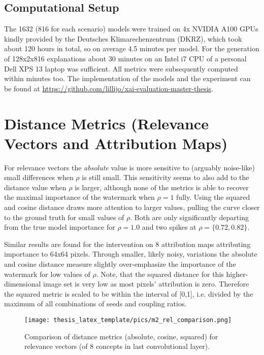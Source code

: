 \subsection{Computational Setup}\label{appendix:setup}
The 1632 (816 for each scenario) models were trained on 4x NVIDIA A100 GPUs kindly provided by the Deutsches Klimarechenzentrum (DKRZ), which took about 120 hours in total, so on average 4.5 minutes per model. 
For the generation of 128x2x816 explanations about 30 minutes on an Intel i7 CPU of a personal Dell XPS 13 laptop was sufficient. All metrics were subsequently computed within minutes too. 
The implementation of the models and the experiment can be found at \url{https://github.com/lillijo/xai-evaluation-master-thesis}.

\section{Distance Metrics (Relevance Vectors and Attribution Maps)}\label{appendix:distance_metrics}

For relevance vectors the \textit{absolute} value is more sensitive to (arguably noise-like) small differences when $\rho$ is still small. This sensitivity seems to also add to the distance value when $\rho$ is larger, although none of the metrics is able to recover the maximal importance of the watermark when $\rho = 1$ fully. 
Using the squared and cosine distance draws more attention to larger values, pulling the curve closer to the ground truth for small values of $\rho$. 
Both are only significantly departing from the true model importance for $\rho = 1.0$ and two spikes at $\rho = \{0.72, 0.82\}$. 

Similar results are found for the intervention on 8 attribution maps attributing importance to 64x64 pixels. 
Through smaller, likely noisy, variations the absolute and cosine distance measure slightly over-emphasize the importance of the watermark for low values of $\rho$. Note, that the squared distance for this higher-dimensional image set is very low as most pixels' attribution is zero. Therefore the squared metric is scaled to be within the interval of [0,1], i.e. divided by the maximum of all combinations of seeds and coupling ratios. 

\begin{figure}
    \centering
    \texttt{[image: thesis\_latex\_template/pics/m2\_rel\_comparison.png]}
    \caption[Relevance Vector, Distance Types]{Comparison of distance metrics (absolute, cosine, squared) for relevance vectors (of 8 concepts in last convolutional layer).}
    \label{fig:m2_rel_comparison}
\end{figure}


